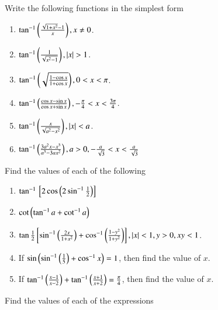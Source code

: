 Write the following functions in the simplest form
\begin{enumerate}[label=\thesubsection.\arabic*,ref=\thesubsection.\theenumi,resume*,itemsep=1ex]
	\item 
		$\tan^{-1}\left(\frac{\sqrt{1+x^2}-1}{x}\right),
x \ne 0$.
	\item 
		$\tan^{-1}\left(\frac{1}{\sqrt{x^2-1}}\right),
		\left\vert x\right\vert > 1$.
	\item 
		$\tan^{-1}\left(\sqrt{\frac{1-\cos x}{1+\cos x}}\right),
		0 < {x} < \pi$.
	\item 
		$\tan^{-1}\left(\frac{\cos x-\sin x}{\cos x+\sin x}\right),
-\frac{\pi}{4} < x < \frac{3\pi}{4}$.
	\item 
		$\tan^{-1}\left(\frac{x}{\sqrt{a^2-x^2}}\right),
		\left\vert x\right\vert < a$.
	\item 
		$\tan^{-1}\left(\frac{3a^2x-x^3}{{a^3-3ax^2}}\right),
		a > 0,
		-\frac{a}{\sqrt{3}} < x < \frac{a}{\sqrt{3}}$
\end{enumerate}
Find the values of each of the following
\begin{enumerate}[label=\thesubsection.\arabic*,ref=\thesubsection.\theenumi,itemsep=1ex]
	\item 
		$\tan^{-1}{}\left[2\cos \left(2\sin^{-1}\frac{1}{2}\right)\right]$
	\item 
		$\cot\left(\tan^{-1}a + \cot^{-1}a\right)$
	\item
		$\tan\frac{1}{2}{}\left[\sin^{-1}\left(\frac{2x}{1+x^2}\right)+\cos^{-1}\left(\frac{1-y^2}{1+y^2}\right)\right],
		\left\vert x\right\vert < 1, y > 0,  xy < 1$.
	\item If 
		$\sin\left(\sin^{-1}\left(\frac{1}{5}\right) + \cos^{-1}x\right)=1$, then find the value of $x$.
	\item If 
		$\tan^{-1}\left(\frac{x-1}{x-2}\right) +\tan^{-1}\left(\frac{x+1}{x+2}\right)=\frac{\pi}{4}$, then find the value of $x$.
\end{enumerate}
Find the values of each of the expressions
